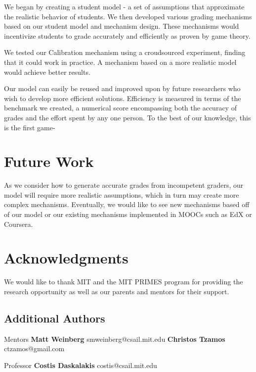 \documentclass{sigchi}
\begin{document}
We began by creating a student model - a set of assumptions that approximate the realistic behavior of students. We then developed various grading mechanisms based on our student model and mechanism design. These mechanisms would incentivize students to grade accurately and efficiently as proven by game theory.

We tested our Calibration mechanism using a croudsourced experiment, finding that it could work in practice. A mechanism based on a more realistic model would achieve better results.

Our model can easily be reused and improved upon by future researchers who wish to develop more efficient solutions. Efficiency is measured in terms of the benchmark we created, a numerical score encompassing both the accuracy of grades and the effort spent by any one person. To the best of our knowledge, this is the first game-

\section{Future Work}
As we consider how to generate accurate grades from incompetent graders, our model will require more realistic assumptions, which in turn may create more complex mechanisms.
Eventually, we would like to see new mechanisms based off of our model or our existing mechanisms implemented in MOOCs such as EdX or Coursera.


\section{Acknowledgments}
We would like to thank MIT and the MIT PRIMES program for providing the research opportunity as well as our parents and mentors for their support.

\subsection{Additional Authors}
Mentors \newline
\textbf{Matt Weinberg} smweinberg@csail.mit.edu \newline
\textbf{Christos Tzamos} ctzamos@gmail.com

Professor \newline
\textbf{Costis Daskalakis} costis@csail.mit.edu


%
%
%
%
\balance



\end{document}
